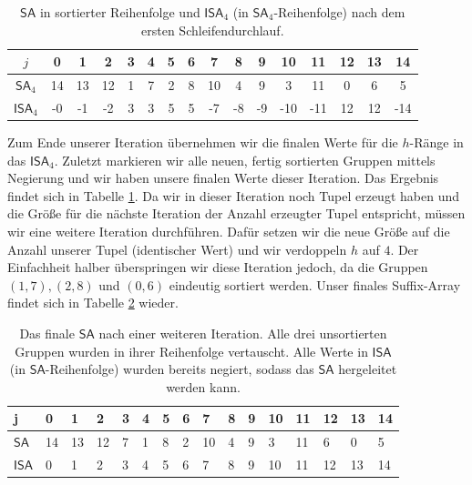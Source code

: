 \begin{table}[]
\small
\begin{tabular}{|c|c|c|c|c|c|c|c|c|c|c|c|c|c|c|c|}
\hline
$j$                              & 0  & 1  & 2  & 3 & 4 & 5 & 6 & 7  & 8 & 9  & 10  & 11  & 12 & 13 & 14  \\ \hline
$\mathsf{SA}_4$               & 14 & 13 & 12 & 1 & 7 & 2 & 8 & 10 & 4 & 9  & 3   & 11  & 0  & 6  & 5   \\ \hline
$\mathsf{ISA}_4$ & -0 & -1 & -2 & 3 & 3 & 5 & 5 & -7  & -8 & -9 & -10 & -11 & 12 & 12 & -14 \\ \hline
\end{tabular}
\caption{$\mathsf{SA}$ in sortierter Reihenfolge und $\mathsf{ISA}_4$ (in $\mathsf{SA}_4$-Reihenfolge) nach dem ersten Schleifendurchlauf.}
\label{tab:osipov-iteration}
\end{table}

Zum Ende unserer Iteration übernehmen wir die finalen Werte für die $h$-Ränge in das $\mathsf{ISA}_4$. Zuletzt markieren wir alle neuen, fertig sortierten Gruppen mittels Negierung und wir haben unsere finalen Werte dieser Iteration. Das Ergebnis findet sich in Tabelle \ref{tab:osipov-iteration}. Da wir in dieser Iteration noch Tupel erzeugt haben und die Größe für die nächste Iteration der Anzahl erzeugter Tupel entspricht, müssen wir eine weitere Iteration durchführen. Dafür setzen wir die neue Größe auf die Anzahl unserer Tupel (identischer Wert) und wir verdoppeln $h$ auf $4$. Der Einfachheit halber überspringen wir diese Iteration jedoch, da die Gruppen $(1, 7), (2,8)$ und $(0,6)$ eindeutig sortiert werden. Unser finales Suffix-Array findet sich in Tabelle \ref{tab:osipov-final} wieder.

\begin{table}[]
\small
\begin{tabular}{|l|l|l|l|l|l|l|l|l|l|l|l|l|l|l|l|}
\hline
j                              & 0  & 1  & 2  & 3  & 4  & 5  & 6  & 7  & 8  & 9  & 10  & 11  & 12  & 13  & 14  \\ \hline
$\mathsf{SA}$               & 14 & 13 & 12 & 7  & 1  & 8  & 2  & 10 & 4  & 9  & 3   & 11  & 6   & 0   & 5   \\ \hline
$\mathsf{ISA}$ & 0 & 1 & 2 & 3 & 4 & 5 & 6 & 7 & 8 & 9 & 10 & 11 & 12 & 13 & 14 \\ \hline
\end{tabular}
\caption{Das finale $\mathsf{SA}$ nach einer weiteren Iteration. Alle drei unsortierten Gruppen wurden in ihrer Reihenfolge vertauscht. Alle Werte in $\mathsf{ISA}$ (in $\mathsf{SA}$-Reihenfolge) wurden bereits negiert, sodass das $\mathsf{SA}$ hergeleitet werden kann.}
\label{tab:osipov-final}
\end{table}

